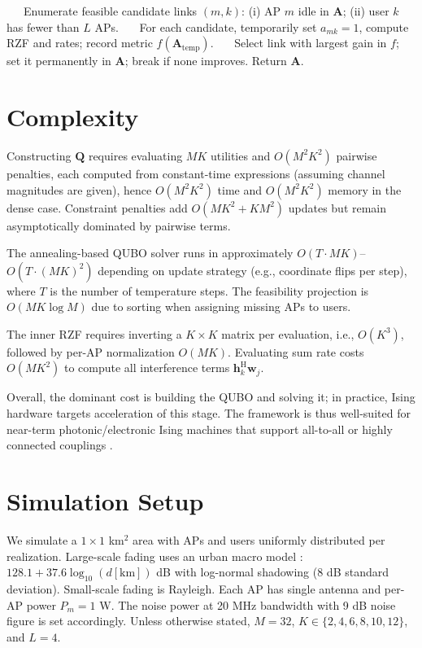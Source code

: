 {\begin{algorithm}[htbp]
\begin{algorithmic}[1]
\State ~~~Enumerate feasible candidate links $(m,k)$: (i) AP $m$ idle in $\mathbf{A}$; (ii) user $k$ has fewer than $L$ APs.
\State ~~~For each candidate, temporarily set $a_{mk}\!=\!1$, compute RZF and rates; record metric $f(\mathbf{A}_{\text{temp}})$.
\State ~~~Select link with largest gain in $f$; set it permanently in $\mathbf{A}$; break if none improves.
\State Return $\mathbf{A}$.
\end{algorithmic}
\end{algorithm}

\section{Complexity}
Constructing $\mathbf{Q}$ requires evaluating $MK$ utilities and $O(M^2K^2)$ pairwise penalties, each computed from constant-time expressions (assuming channel magnitudes are given), hence $O(M^2K^2)$ time and $O(M^2K^2)$ memory in the dense case. Constraint penalties add $O(MK^2+KM^2)$ updates but remain asymptotically dominated by pairwise terms.

The annealing-based QUBO solver runs in approximately $O(T\cdot MK)$–$O(T\cdot (MK)^2)$ depending on update strategy (e.g., coordinate flips per step), where $T$ is the number of temperature steps. The feasibility projection is $O(MK\log M)$ due to sorting when assigning missing APs to users.

The inner RZF requires inverting a $K\times K$ matrix per evaluation, i.e., $O(K^3)$, followed by per-AP normalization $O(MK)$. Evaluating sum rate costs $O(MK^2)$ to compute all interference terms $\mathbf{h}_k^\mathrm{H}\mathbf{w}_j$.

Overall, the dominant cost is building the QUBO and solving it; in practice, Ising hardware targets acceleration of this stage. The framework is thus well-suited for near-term photonic/electronic Ising machines that support all-to-all or highly connected couplings \cite{mcmahon2016fully,inagaki2016coherent}.

\section{Simulation Setup}
We simulate a $1\times 1$ km$^2$ area with APs and users uniformly distributed per realization. Large-scale fading uses an urban macro model \cite{bjornson2016massive}: $128.1+37.6\log_{10}(d[\mathrm{km}])$ dB with log-normal shadowing (8 dB standard deviation). Small-scale fading is Rayleigh. Each AP has single antenna and per-AP power $P_m=1$ W. The noise power at 20 MHz bandwidth with 9 dB noise figure is set accordingly. Unless otherwise stated, $M=32$, $K\in\{2,4,6,8,10,12\}$, and $L=4$.

}
